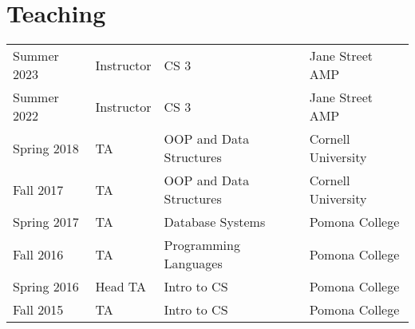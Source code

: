 \documentclass[]{deedy-resume-openfont}
\begin{document}
\begin{minipage}[t]{0.66\textwidth}



\section{Teaching} 

\begin{tabular}{llll}
  
    Summer 2023 & Instructor & CS 3 & Jane Street AMP \\
  
    Summer 2022 & Instructor & CS 3 & Jane Street AMP \\
  
    Spring 2018 & TA & OOP and Data Structures & Cornell University \\
  
    Fall 2017 & TA & OOP and Data Structures & Cornell University \\
  
    Spring 2017 & TA & Database Systems & Pomona College \\
  
    Fall 2016 & TA & Programming Languages & Pomona College \\
  
    Spring 2016 & Head TA & Intro to CS & Pomona College \\
  
    Fall 2015 & TA & Intro to CS & Pomona College \\
  
\end{tabular}


\sectionsep

\end{minipage} 
\end{document}
